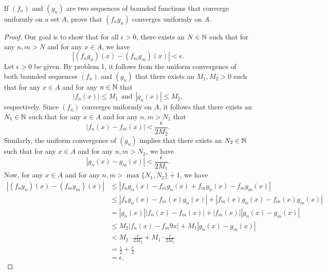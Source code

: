 \documentclass[a4paper]{article}
\begin{document}
\begin{problem}
     If \( ({f}_{n}) \) and \( ({g}_{n})  \) are two sequences of bounded functions that converge uniformly on a set \( A  \), prove that \( ({f}_{n}{g}_{n})  \) converges uniformly on \( A  \).
\end{problem}
\begin{proof}
Our goal is to show that for all \( \epsilon > 0  \), there exists an \( N \in \mathbb{N} \) such that for any \( n,m > N  \) and for any \( x \in A  \), we have  
\[  | ({f}_{n}{g}_{n})(x) - ({f}_{m}{g}_{m})(x) | < \epsilon. \]
Let \( \epsilon > 0  \) be given. By problem 1, it follows from the uniform convergence of both bounded sequences \( ({f}_{n}) \) and \( ({g}_{n}) \) that there exists an \( {M}_{1}, {M}_{2} > 0  \) such that for any \( x \in A  \) and for any \( n \in \mathbb{N} \) that 
\[  | {f}_{n}(x) | \leq {M}_{1} \ \ 
    \text{and} \ \ 
  | {g}_{n}(x) | \leq {M}_{2},  \]
respectively. Since \( ({f}_{n}) \) converges uniformly on \( A  \), it follows that there exists an \( {N}_{1} \in \mathbb{N} \) such that for any \( x \in A  \) and for any \( n,m > {N}_{1} \) that 
\[ | {f}_{n}(x) - {f}_{m}(x) | < \frac{ \epsilon }{ 2 {M}_{2} }. \tag{1} \]
Similarly, the uniform convergence of \( ({g}_{n}) \) implies that there exists an \( {N}_{2} \in \mathbb{N} \) such that for any \( x \in A   \) and for any \( n,m > {N}_{2} \), we have 
\[  | {g}_{n}(x) - {g}_{m}(x) | < \frac{ \epsilon }{ 2 {M}_{1} }. \tag{2} \]
Now, for any \( x \in A  \) and for any \( n,m > \max \{  {N}_{1}, {N}_{2} \} + 1  \), we have 
\begin{align*}
    | ({f}_{n}{g}_{n})(x) - ({f}_{m}{g}_{m})(x) | &\leq | {f}_{n}{g}_{n}(x) -{f}_{m}{g}_{n}(x) + {f}_{m}{g}_{n}(x) - {f}_{m}{g}_{m}(x) |   \\
                                                  &\leq | {f}_{n}{g}_{n}(x) - {f}_{m}(x){g}_{n}(x) |  + | {f}_{m}(x) {g}_{n}(x) - {f}_{m}(x) {g}_{m}(x) |  \\
                                                  &= | {g}_{n}(x) | | {f}_{n}(x) - {f}_{m}(x) |  + | {f}_{m}(x) | | {g}_{n}(x) - {g}_{m}(x) |  \\
                                                  &\leq {M}_{2} | {f}_{n}(x) - {f}_{m}9x |  + {M}_{1} | {g}_{n}(x) - {g}_{m}(x) |  \\
                                                  &< {M}_{2} \cdot \frac{ \epsilon  }{ 2 {M}_{2} }  + {M}_{1} \cdot \frac{ \epsilon  }{  2 {M}_{1} }  \\
                                                  &= \frac{ \epsilon }{ 2 }  + \frac{ \epsilon }{ 2 }  \\
                                                  &= \epsilon.
\end{align*}

\end{proof}
\end{document}

